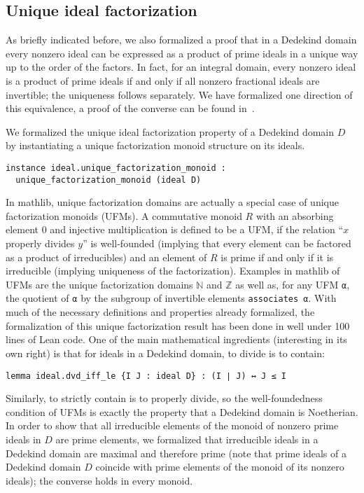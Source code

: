 \documentclass[sn-mathphys]{sn-jnl}%
\newcommand{\lean}[1]{\texttt{#1}\xspace}
\newcommand{\mathlib}{\textsf{mathlib}\xspace}
\newcommand{\N}{\mathbb{N}}
\renewcommand{\Z}{\mathbb{Z}}
\begin{document}
\subsection{Unique ideal factorization}\label{subsec:unique_ideal_factorization}

As briefly indicated before, we also formalized a proof that in a Dedekind domain every nonzero ideal can be expressed as a product of prime ideals in a unique way up to the order of the factors.
In fact, for an integral domain, every nonzero ideal is a product of prime ideals if and only if all nonzero fractional ideals are invertible; the uniqueness follows separately. We have formalized one direction of this equivalence, a proof of the converse can be found in~\cite[Chapter 5, , Theorem 10]{Zariski-Samuel}.

We formalized the unique ideal factorization property of a Dedekind domain $D$ by instantiating a unique factorization monoid structure on its ideals.

\begin{lstlisting}
instance ideal.unique_factorization_monoid :
  unique_factorization_monoid (ideal D)
\end{lstlisting}

In \mathlib, unique factorization domains are actually a special case of unique factorization monoids (UFMs).
A commutative monoid $R$ with an absorbing element $0$ and injective multiplication is defined to be a UFM,
if the relation ``$x$ properly divides $y$'' is well-founded (implying that every element can be factored as a product of irreducibles) and
an element of $R$ is prime if and only if it is irreducible (implying uniqueness of the factorization).
Examples in \mathlib of UFMs are the unique factorization domains $\N$ and $\Z$ as well as, for any UFM \lean{α}, the quotient of \lean{α} by the subgroup of invertible elements \lean{associates α}.
With much of the necessary definitions and properties already formalized, the formalization of this unique factorization result has been done in well under 100 lines of Lean code. One of the main mathematical ingredients (interesting in its own right) is that for ideals in a Dedekind domain, to divide is to contain:

\begin{lstlisting}
lemma ideal.dvd_iff_le {I J : ideal D} : (I ∣ J) ↔ J ≤ I
\end{lstlisting}

Similarly, to strictly contain is to properly divide, so the well-foundedness condition of UFMs is exactly the property that a Dedekind domain is Noetherian. In order to show that all irreducible elements of the monoid of nonzero prime ideals in $D$ are prime elements, we formalized that irreducible ideals in a Dedekind domain are maximal and therefore prime (note that prime ideals of a Dedekind domain $D$ coincide with prime elements of the monoid of its nonzero ideals); the converse holds in every monoid.
\end{document}
